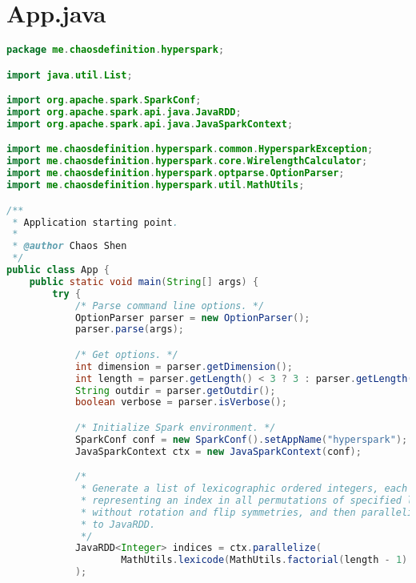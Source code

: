 
\label{Appendix A}

\section{App.java}
\label{Section A.1}

\begin{lstlisting}[language = Java]
package me.chaosdefinition.hyperspark;

import java.util.List;

import org.apache.spark.SparkConf;
import org.apache.spark.api.java.JavaRDD;
import org.apache.spark.api.java.JavaSparkContext;

import me.chaosdefinition.hyperspark.common.HypersparkException;
import me.chaosdefinition.hyperspark.core.WirelengthCalculator;
import me.chaosdefinition.hyperspark.optparse.OptionParser;
import me.chaosdefinition.hyperspark.util.MathUtils;

/**
 * Application starting point.
 *
 * @author Chaos Shen
 */
public class App {
	public static void main(String[] args) {
		try {
			/* Parse command line options. */
			OptionParser parser = new OptionParser();
			parser.parse(args);

			/* Get options. */
			int dimension = parser.getDimension();
			int length = parser.getLength() < 3 ? 3 : parser.getLength();
			String outdir = parser.getOutdir();
			boolean verbose = parser.isVerbose();

			/* Initialize Spark environment. */
			SparkConf conf = new SparkConf().setAppName("hyperspark");
			JavaSparkContext ctx = new JavaSparkContext(conf);

			/*
			 * Generate a list of lexicographic ordered integers, each
			 * representing an index in all permutations of specified length
			 * without rotation and flip symmetries, and then parallelize them
			 * to JavaRDD.
			 */
			JavaRDD<Integer> indices = ctx.parallelize(
					MathUtils.lexicode(MathUtils.factorial(length - 1) / 2)
			);


\end{lstlisting}
